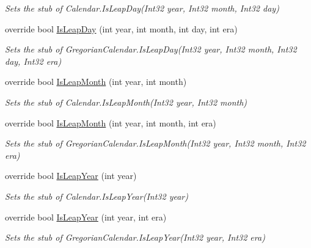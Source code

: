 \begin{DoxyCompactItemize}
\begin{DoxyCompactList}\small\item\em Sets the stub of Calendar.\-Is\-Leap\-Day(\-Int32 year, Int32 month, Int32 day)\end{DoxyCompactList}\item 
override bool \hyperlink{class_system_1_1_globalization_1_1_fakes_1_1_stub_gregorian_calendar_ac16dc7b28ba73348aa77810a461ba45c}{Is\-Leap\-Day} (int year, int month, int day, int era)
\begin{DoxyCompactList}\small\item\em Sets the stub of Gregorian\-Calendar.\-Is\-Leap\-Day(\-Int32 year, Int32 month, Int32 day, Int32 era)\end{DoxyCompactList}\item 
override bool \hyperlink{class_system_1_1_globalization_1_1_fakes_1_1_stub_gregorian_calendar_a9cd4980faa804b554e78fcf7a2f35031}{Is\-Leap\-Month} (int year, int month)
\begin{DoxyCompactList}\small\item\em Sets the stub of Calendar.\-Is\-Leap\-Month(\-Int32 year, Int32 month)\end{DoxyCompactList}\item 
override bool \hyperlink{class_system_1_1_globalization_1_1_fakes_1_1_stub_gregorian_calendar_a7a72eea9c04b796cedffd2bb33a32aed}{Is\-Leap\-Month} (int year, int month, int era)
\begin{DoxyCompactList}\small\item\em Sets the stub of Gregorian\-Calendar.\-Is\-Leap\-Month(\-Int32 year, Int32 month, Int32 era)\end{DoxyCompactList}\item 
override bool \hyperlink{class_system_1_1_globalization_1_1_fakes_1_1_stub_gregorian_calendar_ad3b50cdea5b4967c7f66aa11071c7752}{Is\-Leap\-Year} (int year)
\begin{DoxyCompactList}\small\item\em Sets the stub of Calendar.\-Is\-Leap\-Year(\-Int32 year)\end{DoxyCompactList}\item 
override bool \hyperlink{class_system_1_1_globalization_1_1_fakes_1_1_stub_gregorian_calendar_a9dcf83e3145b7455faa2240e954bf151}{Is\-Leap\-Year} (int year, int era)
\begin{DoxyCompactList}\small\item\em Sets the stub of Gregorian\-Calendar.\-Is\-Leap\-Year(\-Int32 year, Int32 era)\end{DoxyCompactList}\item 

\end{DoxyCompactItemize}
